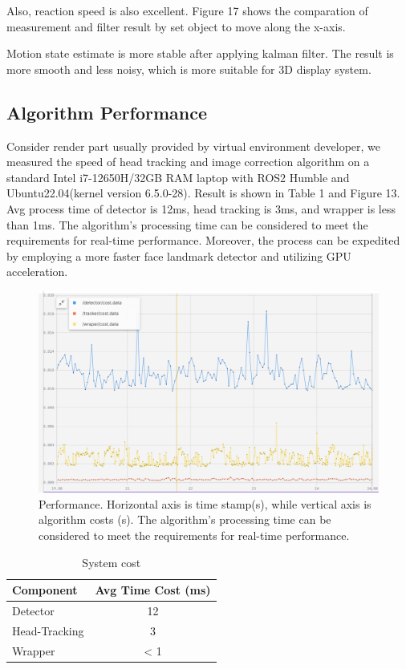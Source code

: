 Also, reaction speed is also excellent. Figure 17 shows the comparation of measurement and filter result by set object to move along the x-axis.

Motion state estimate is more stable after applying kalman filter. The result is more smooth and less noisy, which is more suitable for 3D display system.
\clearpage

\subsection{Algorithm Performance}
Consider render part usually provided by virtual environment developer, we measured the speed of head tracking and image correction algorithm on a standard Intel i7-12650H/32GB RAM laptop with ROS2 Humble and Ubuntu22.04(kernel version 6.5.0-28). Result is shown in Table 1 and Figure 13. Avg process time of detector is 12ms, head tracking is 3ms, and wrapper is less than 1ms. The algorithm's processing time can be considered to meet the requirements for real-time performance. Moreover, the process can be expedited by employing a more faster face landmark detector and utilizing GPU acceleration.

\begin{figure}
    \centering
    \includegraphics[width=1\textwidth]{figures/Implementation/cost.png}
    \caption{Performance. Horizontal axis is time stamp(s), while vertical axis is algorithm costs (s). The algorithm's processing time can be considered to meet the requirements for real-time performance. }\label{F:test-a}
\end{figure}


\begin{table}[h!]
    \centering
    \begin{tabular}{lc}
        \toprule
        Component     & Avg Time Cost (ms) \\
        \midrule
        Detector      & 12                 \\
        Head-Tracking & 3                  \\
        Wrapper       & < 1                \\
        \bottomrule
    \end{tabular}
    \caption{System cost}
    \label{tab:your_label}
\end{table}


